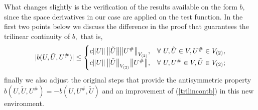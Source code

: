 \documentclass[11pt]{article}
\begin{document}
What changes slightly is the verification of the results available on the form $b,$ since the space derivatives in our case are applied on the test function. In the first two points below we discuss the difference in the proof that guarantees the trilinear continuity of $b,$ that is,
%
\begin{equation} \label{trilincontb}
\lvert b(U, \tilde{U}, U^\# ) \rvert \leq \begin{cases}
c \norm{U} \big \|\tilde{U}\big \| \big \| U^\# \big \|_{V_{(2)}}, & \forall \text{ } U, \tilde{U} \in V, U^\# \in V_{(2)}, \\
c \norm{U} \big \|\tilde{U}\big \| _{V_{(2)}} \big \| U^\# \big \|, & \forall \text{ } U, U^\# \in V, \tilde{U} \in V_{(2)};
\end{cases}
\end{equation}
%
finally we also adjust the original steps that provide the antisymmetric property $b(U, \tilde{U}, U^\# ) = - b(U, U^\#, \tilde{U} )$ and an improvement of (\ref{trilincontb}) in this new environment.
\end{document}
